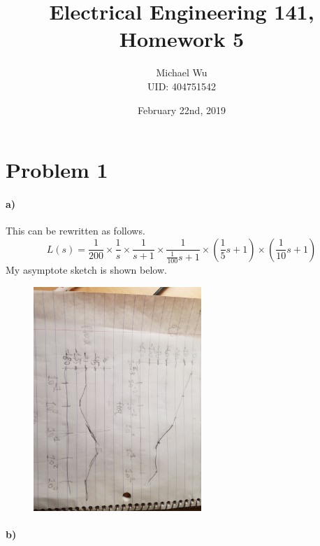 \documentclass[12pt]{article}
\begin{document}
\title{Electrical Engineering 141, Homework 5}
\date{February 22nd, 2019}
\author{Michael Wu\\UID: 404751542}
\maketitle

\section*{Problem 1}

\paragraph{a)}

This can be rewritten as follows.
\[L(s)=\frac{1}{200}\times\frac{1}{s}\times\frac{1}{s+1}\times\frac{1}{\frac{1}{100}s+1}\times\left(\frac{1}{5}s+1\right)\times\left(\frac{1}{10}s+1\right)\]
My asymptote sketch is shown below.
\begin{figure}[H]
    \begin{center}
        \includegraphics[width=2.5in]{problem1a.jpg}
    \end{center}
\end{figure}

\paragraph{b)}
\end{document}
